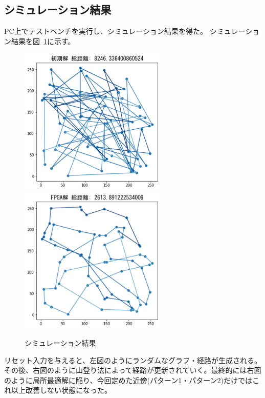 \subsection*{シミュレーション結果}
PC上でテストベンチを実行し、シミュレーション結果を得た。
シミュレーション結果を図~\ref{fig:sim}に示す。
\begin{figure}[h]
    \label{fig:sim}
    \begin{center}
        \includegraphics[width=7cm]{figure/fpga_tsp_bad.png}
        \includegraphics[width=7cm]{figure/fpga_tsp_good.png}
        \caption{シミュレーション結果}
    \end{center}
\end{figure}
リセット入力を与えると、左図のようにランダムなグラフ・経路が生成される。
その後、右図のように山登り法によって経路が更新されていく。最終的には右図のように局所最適解に陥り、今回定めた近傍(パターン1・パターン2)だけではこれ以上改善しない状態になった。

